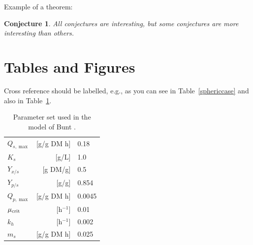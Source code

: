 \documentclass{river-journal}
\newtheorem{guess}{Conjecture}
\begin{document}
Example of a theorem:


\begin{guess}
All conjectures are interesting, but some conjectures are more
interesting than others.
\end{guess}


\section{Tables and Figures}

Cross reference should be labelled, e.g., as you can see in
Table~\ref{sphericcase} and also in Table~\ref{parset}.


\begin{table} %
\caption[]{Parameter set used in the model of Bunt \cite{Bunt}. }\label{parset}
\begin{tabular}{lrl}
\hline
$Q_{s,\max}$   & [g/g DM h]  & 0.18\\
$K_{s}$       & [g/L]        & 1.0\\
$Y_{x/s}$     & [g DM/g]     & 0.5\\
$Y_{p/s}$     & [g/g]        & 0.854\\
$Q_{p,\max}$   & [g/g DM h]  & 0.0045\\
$\mu_{\rm crit}$  & [h$^{-1}$]  & 0.01\\
$k_{h}$       & [h$^{-1}$]  & 0.002\\
$m_{s}$       & [g/g DM h]  & 0.025\\
\hline
\end{tabular}
\end{table}
\end{document}
